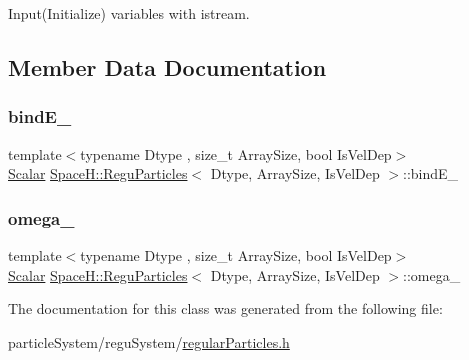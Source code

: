 Input(\+Initialize) variables with istream. 



\subsection{Member Data Documentation}
\mbox{\label{class_space_h_1_1_regu_particles_af708a170d51c845813d8f8ef01a3ac79}} 
\subsubsection{\texorpdfstring{bind\+E\+\_\+}{bindE\_}}
{\footnotesize\ttfamily template$<$typename Dtype , size\+\_\+t Array\+Size, bool Is\+Vel\+Dep$>$ \\
\mbox{\hyperlink{class_space_h_1_1_vel_indep_particles_aeb47d8131b30ed790320ff634f0d6af1}{Scalar}} \mbox{\hyperlink{class_space_h_1_1_regu_particles}{Space\+H\+::\+Regu\+Particles}}$<$ Dtype, Array\+Size, Is\+Vel\+Dep $>$\+::bind\+E\+\_\+\hspace{0.3cm}{\ttfamily [protected]}}

\mbox{\label{class_space_h_1_1_regu_particles_a7e9eaabdd5e20d9ea16a56c22929273a}} 
\subsubsection{\texorpdfstring{omega\+\_\+}{omega\_}}
{\footnotesize\ttfamily template$<$typename Dtype , size\+\_\+t Array\+Size, bool Is\+Vel\+Dep$>$ \\
\mbox{\hyperlink{class_space_h_1_1_vel_indep_particles_aeb47d8131b30ed790320ff634f0d6af1}{Scalar}} \mbox{\hyperlink{class_space_h_1_1_regu_particles}{Space\+H\+::\+Regu\+Particles}}$<$ Dtype, Array\+Size, Is\+Vel\+Dep $>$\+::omega\+\_\+\hspace{0.3cm}{\ttfamily [protected]}}



The documentation for this class was generated from the following file\+:\begin{DoxyCompactItemize}
\item 
particle\+System/regu\+System/\mbox{\hyperlink{regular_particles_8h}{regular\+Particles.\+h}}\end{DoxyCompactItemize}
